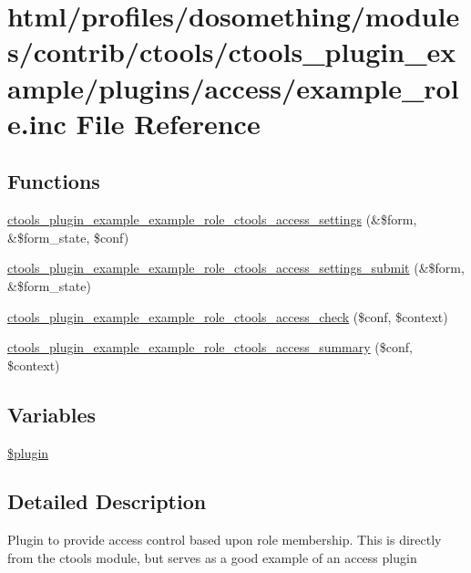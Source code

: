 \hypertarget{example__role_8inc}{
\section{html/profiles/dosomething/modules/contrib/ctools/ctools\_\-plugin\_\-example/plugins/access/example\_\-role.inc File Reference}
\label{example__role_8inc}
}
\subsection*{Functions}
\begin{DoxyCompactItemize}
\item 
\hyperlink{example__role_8inc_a2508fc7a1263233b09e78a5a6dce6077}{ctools\_\-plugin\_\-example\_\-example\_\-role\_\-ctools\_\-access\_\-settings} (\&\$form, \&\$form\_\-state, \$conf)
\item 
\hyperlink{example__role_8inc_a6d49c7c77fa3846ebb7d708131966904}{ctools\_\-plugin\_\-example\_\-example\_\-role\_\-ctools\_\-access\_\-settings\_\-submit} (\&\$form, \&\$form\_\-state)
\item 
\hyperlink{example__role_8inc_acb67f2b37e5052b3517949614b9972d4}{ctools\_\-plugin\_\-example\_\-example\_\-role\_\-ctools\_\-access\_\-check} (\$conf, \$context)
\item 
\hyperlink{example__role_8inc_a933cad4dca2ae3531311b8678d4a9f66}{ctools\_\-plugin\_\-example\_\-example\_\-role\_\-ctools\_\-access\_\-summary} (\$conf, \$context)
\end{DoxyCompactItemize}
\subsection*{Variables}
\begin{DoxyCompactItemize}
\item 
\hyperlink{example__role_8inc_ada8a7130088351710bb02ed622d6bf65}{\$plugin}
\end{DoxyCompactItemize}


\subsection{Detailed Description}
Plugin to provide access control based upon role membership. This is directly from the ctools module, but serves as a good example of an access plugin 

